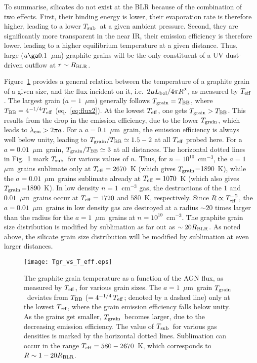 \documentclass[a4paper,fleqn,usenatbib]{mnras}
\newcommand{\mic}{\mbox{$\mu$m}}
\newcommand{\Tsub}{\mbox{$T_{\rm sub}$}}
\newcommand{\Tgr}{\mbox{$T_{\rm grain}$}}
\begin{document}
To summarise, silicates do not exist at the BLR because of the combination of two effects. First, their binding energy is lower, 
their evaporation rate is therefore higher, leading to a lower \Tsub\ at a given 
ambient pressure. Second, they are significantly more transparent in the near IR, their emission efficiency 
is therefore lower, leading to a higher equilibrium temperature at a given distance.
Thus, large ($a\ga0.1$~\mic) graphite grains will be the only constituent of a UV dust-driven outflow at $r\sim R_{\rm BLR}$.
	

Figure~\ref{fig:Tgr_vs_T_eff} provides a general relation between the temperature of a graphite grain
of a given size, and the flux incident on it, i.e.\
$2\mu L_{\rm bol}/4\pi R^2$, as measured by $T_{\rm eff}$.  The largest grain ($a=1$~\mic)
generally follows $\Tgr=T_{\rm BB}$, where $T_{\rm BB}=4^{-1/4}T_{\rm eff}$ (eq.~\ref{eq:flux2}). 
At the lowest $T_{\rm eff}$, one gets $\Tgr>T_{\rm BB}$. This results from the drop in the emission efficiency, due to the lower
\Tgr, which leads to $\lambda_{\rm em}>2\pi a$. For a $a=0.1$~\mic\ grain, the emission efficiency
is always well below unity, leading to $\Tgr/T_{\rm BB}\simeq 1.5-2$ at all $T_{\rm eff}$
probed here. For a $a=0.01$~\mic\ grain, $\Tgr/T_{\rm BB}\simeq 3$ at all distances. 
The horizontal dotted lines in Fig.~\ref{fig:Tgr_vs_T_eff} mark \Tsub\ for various values of $n$. Thus, for
$n=10^{10}$~cm$^{-3}$, the $a=1$~\mic\ grains sublimate only at $T_{\rm eff}=2670$~K
(which gives \Tgr=1890~K), while the $a=0.01$~\mic\ grains sublimate already at $T_{\rm eff}=1070$~K 
(which also gives \Tgr=1890~K). In low density $n=1$~cm$^{-3}$ gas, the destructions
of the $1$ and $0.01$~\mic\ grains occur at $T_{\rm eff}=1720$ and $580$~K, respectively. 
Since $R\propto T_{\rm eff}^{-2}$, the $a=0.01$~\mic\ grains in low density gas
are destroyed at a radius $\sim 20$ times larger than the radius for the $a=1$~\mic\ grains
at $n=10^{10}$~cm$^{-3}$.  The graphite grain size distribution is modified by sublimation as far out as $\sim 20R_{\rm BLR}$. As noted above,
the silicate grain size distribution will be modified by sublimation at even larger distances.



\begin{figure}
\texttt{[image: Tgr\_vs\_T\_eff.eps]}
\caption{The graphite grain temperature as a function of the AGN flux, as measured by $T_{\rm eff}$, for various grain sizes. 
The $a=1$~\mic\ grain \Tgr\ deviates from
$T_{\rm BB}$ ($=4^{-1/4}\,T_{\rm eff}$; denoted by a dashed line) only at the lowest 
$T_{\rm eff}$, where the grain emission efficiency falls below unity. As the grains get smaller,
\Tgr\ becomes larger, due to the decreasing emission efficiency.
The value of \Tsub\ for various gas densities is marked by the horizontal dotted lines. 
Sublimation can occur in the range $T_{\rm eff}=580-2670$~K, which corresponds to 
$R\sim 1-20R_{\rm BLR}$.}
\label{fig:Tgr_vs_T_eff}
\end{figure}
\end{document}
